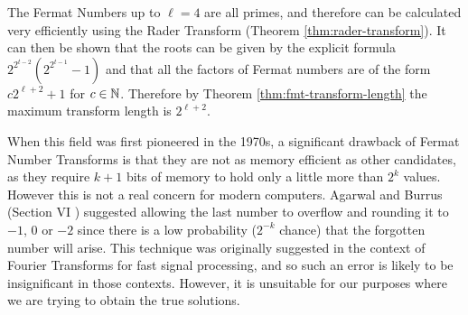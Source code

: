 The Fermat Numbers up to $\ell = 4$ are all primes, and therefore can be calculated very efficiently using the Rader Transform (Theorem \ref{thm:rader-transform}). It can then be shown \cite{intro-to-fmt} that the roots can be given by the explicit formula $2^{2^{t-2}}(2^{2^{t-1}} - 1)$ and that all the factors of Fermat numbers are of the form $c2^{\ell + 2} + 1$ for $c \in {\mathbb N}$. Therefore by Theorem \ref{thm:fmt-transform-length} the maximum transform length is $2^{\ell + 2}$. 

When this field was first pioneered in the 1970s, a significant drawback of Fermat Number Transforms is that they are not as memory efficient as other candidates, as they require $k + 1$ bits of memory to hold only a little more than $2^k$ values. However this is not a real concern for modern computers. Agarwal and Burrus (Section VI \cite{intro-to-fmt}) suggested allowing the last number to overflow and rounding it to $\minus 1$, $0$ or $-2$ since there is a low probability ($2^{-k}$ chance) that the forgotten number will arise. This technique was originally suggested in the context of Fourier Transforms for fast signal processing, and so such an error is likely to be insignificant in those contexts. However, it is unsuitable for our purposes where we are trying to obtain the true solutions.
